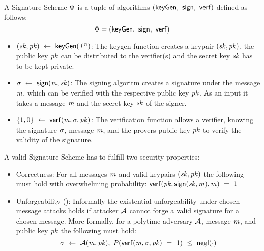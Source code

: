 
\begin{definition}\label{def:pre:signature-scheme}
    A Signature Scheme $\Phi$ is a tuple of algorithms $(\mathsf{keyGen} ,~ \mathsf{sign} ,~ \mathsf{verf})$ defined as follows:~\cite{goldwasser1988digital}
    \[ \Phi = (\mathsf{keyGen} ,~ \mathsf{sign} ,~ \mathsf{verf}) \]

    \begin{itemize}
        \item $(\mathit{sk}, \mathit{pk}) ~\leftarrow~ \mathsf{keyGen}(\mathit{1^n})$: The keygen function creates a keypair $(\mathit{sk}, \mathit{pk})$, the public key $\mathit{pk}$ can be distributed to the verifier(s) and the secret key $\mathit{sk}$ has to be kept private. \\
        \item $\sigma ~\leftarrow~ \mathsf{sign}(\mathit{m}, \mathit{sk})$: The signing algoritm creates a signature under the message $\mathit{m}$, which can be verified with the respective public key $\mathit{pk}$.
        As an input it takes a message $\mathit{m}$ and the secret key $\mathit{sk}$ of the signer.
        \item $\{1,0\} ~\leftarrow~ \mathsf{verf}(\mathit{m}, \sigma, \mathit{pk})$: The verification function allows a verifier, knowing the signature $\sigma$, message $\mathit{m}$, and the provers public key $\mathit{pk}$ to verify the validity of the signature.
    \end{itemize}

    A valid Signature Scheme has to fulfill two security properties:
    \begin{itemize}
        \item Correctness: For all messages $\mathit{m}$ and valid keypairs $(\mathit{sk}, \mathit{pk})$ the following must hold with overwhelming probability: $\mathsf{verf}(\mathit{pk}, \mathsf{sign}(\mathit{sk}, \mathit{m}), \mathit{m}) ~=~ 1$
        \item Unforgeability (\cnstEUFCMA): Informally the existential unforgeability under chosen message attacks holds if attacker $\mathcal{A}$ cannot forge a valid signature for a chosen message.
        More formally, for a polytime adversary $\mathcal{A}$, message $\mathit{m}$, and public key $\mathit{pk}$ the following must hold:
        \[ \sigma ~\leftarrow~ \mathcal{A}(\mathit{m}, \mathit{pk}), \; \mathit{P}(\mathsf{verf}(\mathit{m}, \sigma, \mathit{pk}) ~=~ 1) ~\leq~ \mathsf{negl}(\cdot) \]
    \end{itemize}
\end{definition}

